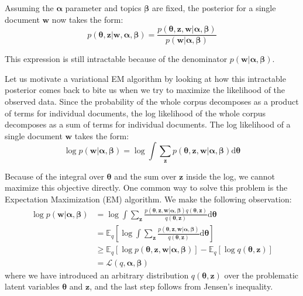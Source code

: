 \documentclass{article}
\newcommand{\diff}{\mathrm{d}}
\begin{document}
Assuming the $\bm{\alpha}$ parameter and topics $\bm{\beta}$ are fixed, the posterior for a single document $\mathbf{w}$ now takes the form:
\begin{equation}
p(\bm{\theta}, \mathbf{z} | \mathbf{w}, \bm{\alpha}, \bm{\beta}) =
\frac{p(\bm{\theta}, \mathbf{z}, \mathbf{w} | \bm{\alpha}, \bm{\beta})}
		{p(\mathbf{w} | \bm{\alpha}, \bm{\beta})} 
\end{equation}

This expression is still intractable because of the denominator $p(\mathbf{w} | \bm{\alpha}, \bm{\beta})$. 

Let us motivate a variational EM algorithm by looking at how this intractable posterior comes back to bite us when we try to maximize the likelihood of the observed data. Since the probability of the whole corpus decomposes as a product of terms for individual documents, the log likelihood of the whole corpus decomposes as a sum of terms for individual documents. The log likelihood of a single document $\mathbf{w}$ takes the form:
\begin{equation}
\log p(\mathbf{w} | \bm{\alpha}, \bm{\beta}) =
	\log \int \sum_{\mathbf{z}} p (\bm{\theta}, \mathbf{z}, \mathbf{w} | \bm{\alpha}, \bm{\beta}) \diff\bm{\theta} 
\end{equation}

Because of the integral over $\bm{\theta}$ and the sum over $\mathbf{z}$ inside the log, we cannot maximize this objective directly. One common way to solve this problem is the Expectation Maximization (EM) algorithm. We make the following observation:
\begin{align*}
\log p(\mathbf{w} | \bm{\alpha}, \bm{\beta}) 
&= \log \int \sum_{\mathbf{z}} \frac{p (\bm{\theta}, \mathbf{z}, \mathbf{w} | \bm{\alpha}, \bm{\beta}) q(\bm{\theta}, \mathbf{z})}{q(\bm{\theta}, \mathbf{z})}  \diff\bm{\theta} \\
&= \mathbb{E}_q \left[\log \int \sum_{\mathbf{z}} \frac{p (\bm{\theta}, \mathbf{z}, \mathbf{w} | \bm{\alpha}, \bm{\beta})}{q(\bm{\theta}, \mathbf{z})}  \diff\bm{\theta}\right] \\
&\geq \mathbb{E}_q \left[\log p(\bm{\theta}, \mathbf{z}, \mathbf{w} | \bm{\alpha}, \bm{\beta})\right] - \mathbb{E}_q \left[\log q(\bm{\theta}, \mathbf{z})\right] \\
&= \mathcal{L}(q, \bm{\alpha}, \bm{\beta})
\end{align*}
where we have introduced an arbitrary distribution $q(\bm{\theta}, \mathbf{z})$ over the problematic latent variables $\bm{\theta}$ and $\mathbf{z}$, and the last step follows from Jensen's inequality.
\end{document}
